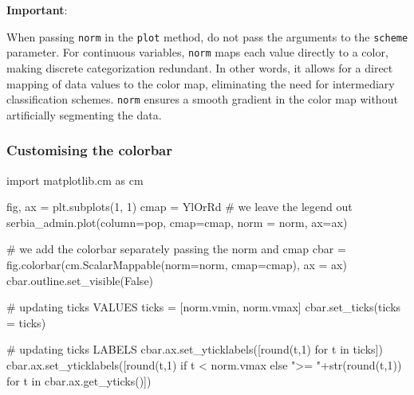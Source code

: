 \documentclass[
  letterpaper,
  DIV=11,
  numbers=noendperiod]{scrreprt}
\newenvironment{Shaded}{\begin{snugshade}}{\end{snugshade}}
\newcommand{\BuiltInTok}[1]{\textcolor[rgb]{0.00,0.23,0.31}{#1}}
\newcommand{\CommentTok}[1]{\textcolor[rgb]{0.37,0.37,0.37}{#1}}
\newcommand{\ControlFlowTok}[1]{\textcolor[rgb]{0.00,0.23,0.31}{#1}}
\newcommand{\DecValTok}[1]{\textcolor[rgb]{0.68,0.00,0.00}{#1}}
\newcommand{\ImportTok}[1]{\textcolor[rgb]{0.00,0.46,0.62}{#1}}
\newcommand{\KeywordTok}[1]{\textcolor[rgb]{0.00,0.23,0.31}{#1}}
\newcommand{\NormalTok}[1]{\textcolor[rgb]{0.00,0.23,0.31}{#1}}
\newcommand{\OperatorTok}[1]{\textcolor[rgb]{0.37,0.37,0.37}{#1}}
\newcommand{\StringTok}[1]{\textcolor[rgb]{0.13,0.47,0.30}{#1}}
\newcommand{\VariableTok}[1]{\textcolor[rgb]{0.07,0.07,0.07}{#1}}
\begin{document}
\textbf{Important}:

When passing \texttt{norm} in the \texttt{plot} method, do not pass the
arguments to the \texttt{scheme} parameter. For continuous variables,
\texttt{norm} maps each value directly to a color, making discrete
categorization redundant. In other words, it allows for a direct mapping
of data values to the color map, eliminating the need for intermediary
classification schemes. \texttt{norm} ensures a smooth gradient in the
color map without artificially segmenting the data.

\hypertarget{customising-the-colorbar}{%
\subsubsection{Customising the
colorbar}\label{customising-the-colorbar}}

\begin{Shaded}
\begin{Highlighting}[]
\ImportTok{import}\NormalTok{ matplotlib.cm }\ImportTok{as}\NormalTok{ cm}

\NormalTok{fig, ax }\OperatorTok{=}\NormalTok{ plt.subplots(}\DecValTok{1}\NormalTok{, }\DecValTok{1}\NormalTok{)}
\NormalTok{cmap }\OperatorTok{=} \StringTok{\textquotesingle{}YlOrRd\textquotesingle{}}
\CommentTok{\# we leave the legend out}
\NormalTok{serbia\_admin.plot(column}\OperatorTok{=}\StringTok{\textquotesingle{}pop\textquotesingle{}}\NormalTok{, cmap}\OperatorTok{=}\NormalTok{cmap, norm }\OperatorTok{=}\NormalTok{ norm, ax}\OperatorTok{=}\NormalTok{ax)}

\CommentTok{\# we add the colorbar separately passing the norm and cmap}
\NormalTok{cbar }\OperatorTok{=}\NormalTok{ fig.colorbar(cm.ScalarMappable(norm}\OperatorTok{=}\NormalTok{norm, cmap}\OperatorTok{=}\NormalTok{cmap), ax }\OperatorTok{=}\NormalTok{ ax)}
\NormalTok{cbar.outline.set\_visible(}\VariableTok{False}\NormalTok{)}

\CommentTok{\# updating ticks VALUES}
\NormalTok{ticks }\OperatorTok{=}\NormalTok{ [norm.vmin, norm.vmax]}
\NormalTok{cbar.set\_ticks(ticks }\OperatorTok{=}\NormalTok{ ticks)}

\CommentTok{\# updating ticks LABELS}
\NormalTok{cbar.ax.set\_yticklabels([}\BuiltInTok{round}\NormalTok{(t,}\DecValTok{1}\NormalTok{) }\ControlFlowTok{for}\NormalTok{ t }\KeywordTok{in}\NormalTok{ ticks])}
\NormalTok{cbar.ax.set\_yticklabels([}\BuiltInTok{round}\NormalTok{(t,}\DecValTok{1}\NormalTok{) }\ControlFlowTok{if}\NormalTok{ t }\OperatorTok{\textless{}}\NormalTok{ norm.vmax }\ControlFlowTok{else} \StringTok{"\textgreater{}= "}\OperatorTok{+}\BuiltInTok{str}\NormalTok{(}\BuiltInTok{round}\NormalTok{(t,}\DecValTok{1}\NormalTok{)) }\ControlFlowTok{for}\NormalTok{ t }\KeywordTok{in}\NormalTok{ cbar.ax.get\_yticks()])}
\end{Highlighting}
\end{Shaded}
\end{document}

